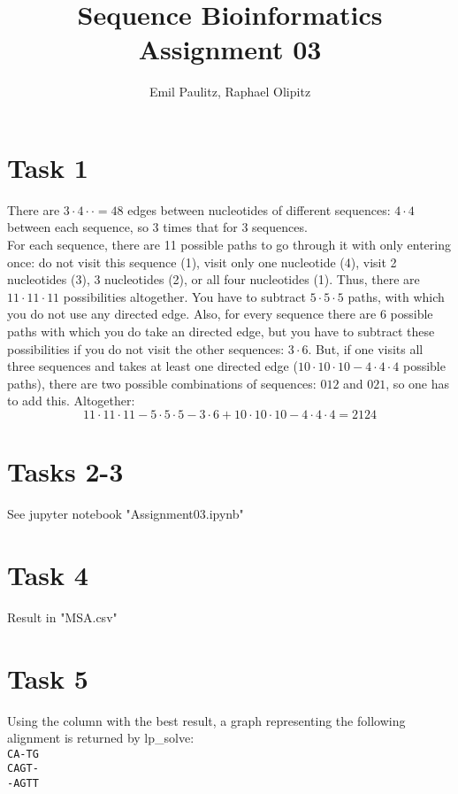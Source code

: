 \documentclass[10pt,a4paper]{article}
\author{Emil Paulitz, Raphael Olipitz}
\title{Sequence Bioinformatics\\Assignment 03}
\begin{document}
	\ohead{\theauthor}
	\cfoot{\pagemark}
	\maketitle
	\section*{Task 1}
		There are $3\cdot4\cdot\cdot = 48$ edges between nucleotides of different sequences: $4\cdot4$ between each sequence, so $3$ times that for $3$ sequences.\\
		For each sequence, there are 11 possible paths to go through it with only entering once: do not visit this sequence (1), visit only one nucleotide (4), visit 2 nucleotides (3), 3 nucleotides (2), or all four nucleotides (1). Thus, there are $11\cdot11\cdot11$ possibilities altogether. You have to subtract $5\cdot5\cdot5$ paths, with which you do not use any directed edge. Also, for every sequence there are 6 possible paths with which you do take an directed edge, but you have to subtract these possibilities if you do not visit the other sequences: $3\cdot6$. But, if one visits all three sequences and takes at least one directed edge ($10\cdot10\cdot10 - 4\cdot4\cdot4$ possible paths), there are two possible combinations of sequences: $012$ and $021$, so one has to add this. Altogether: $$11\cdot11\cdot11 - 5\cdot5\cdot5 - 3\cdot6 + 10\cdot10\cdot10 - 4\cdot4\cdot4 = 2124$$
	\section*{Tasks 2-3}
		See jupyter notebook "Assignment03.ipynb"
	\section*{Task 4}
		Result in "MSA.csv"
	\section*{Task 5}
		Using the column with the best result, a graph representing the following alignment is returned by lp\_solve:\\
		\texttt{CA-TG\\CAGT-\\-AGTT}
		
\end{document}
